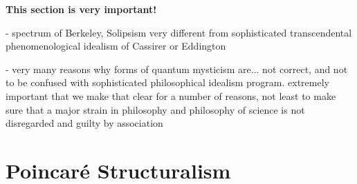 \textbf{This section is very important!}

- spectrum of Berkeley, Solipsism very different from sophisticated transcendental phenomenological idealism of Cassirer or Eddington  

- very many reasons why forms of quantum mysticism are... not correct, and not to be confused with sophisticated philosophical idealism program.  extremely important that we make that clear for a number of reasons, not least to make sure that a major strain in philosophy and philosophy of science is not disregarded and guilty by association






\section{Poincar\'e Structuralism}

